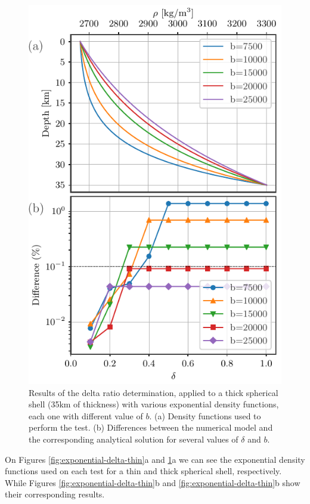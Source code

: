 \documentclass[extra]{gji}
\begin{document}
\begin{figure}
\centering
\includegraphics[width=0.9\linewidth]{figures/exponential-delta-thick.pdf}
\caption{
    Results of the delta ratio determination, applied to a thick spherical shell (35km of thickness) with various exponential density functions, each one with different value of $b$.
    (a) Density functions used to perform the test.
    (b) Differences between the numerical model and the corresponding analytical solution for several values of $\delta$ and $b$.}
\label{fig:exponential-delta-thick}
\end{figure}

On Figures \ref{fig:exponential-delta-thin}a and \ref{fig:exponential-delta-thick}a we can see the exponential density functions used on each test for a thin and thick spherical shell, respectively.
While Figures \ref{fig:exponential-delta-thin}b and \ref{fig:exponential-delta-thin}b show their corresponding results.
\end{document}
